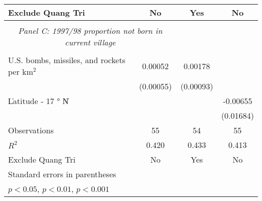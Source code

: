 \begin{table}[htbp]
\begin{tabular}{l*{3}{c}}
Exclude Quang Tri   &          No         &         Yes         &          No         \\
\hline \\ \multicolumn{2}{c}{\emph{Panel C: 1997/98 proportion not born in current village}} \\\\[-1ex]
U.S. bombs, missiles, and rockets per km$^2$&     0.00052         &     0.00178         &                     \\
                    &   (0.00055)         &   (0.00093)         &                     \\
[1em]
\|Latitude - 17 $°$ N\|&                     &                     &    -0.00655         \\
                    &                     &                     &   (0.01684)         \\
\hline
Observations        &          55         &          54         &          55         \\
\(R^{2}\)           &       0.420         &       0.433         &       0.413         \\
Exclude Quang Tri   &          No         &         Yes         &          No         \\
\hline\hline \multicolumn{5}{l}{\footnotesize Standard errors in parentheses}\\\multicolumn{3}{l}{\footnotesize \sym{*} \(p<0.05\), \sym{**} \(p<0.01\), \sym{***} \(p<0.001\)}\\ \end{tabular} \\ \end{table}
